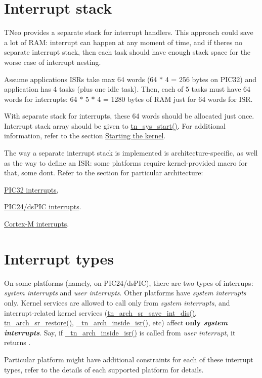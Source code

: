 \hypertarget{interrupts_interrupt_stack}{}\section{Interrupt stack}\label{interrupts_interrupt_stack}
T\+Neo provides a separate stack for interrupt handlers. This approach could save a lot of R\+AM\+: interrupt can happen at any moment of time, and if there\textquotesingle{}s no separate interrupt stack, then each task should have enough stack space for the worse case of interrupt nesting.

Assume application\textquotesingle{}s I\+S\+Rs take max 64 words (64 $\ast$ 4 = 256 bytes on P\+I\+C32) and application has 4 tasks (plus one idle task). Then, each of 5 tasks must have 64 words for interrupts\+: 64 $\ast$ 5 $\ast$ 4 = 1280 bytes of R\+AM just for 64 words for I\+SR.

With separate stack for interrupts, these 64 words should be allocated just once. Interrupt stack array should be given to {\ttfamily \hyperlink{tn__sys_8h_a62ab25d9d8ca01c02d368968f19e49bf}{tn\+\_\+sys\+\_\+start()}}. For additional information, refer to the section \hyperlink{quick_guide_starting_the_kernel}{Starting the kernel}.

The way a separate interrupt stack is implemented is architecture-\/specific, as well as the way to define an I\+SR\+: some platforms require kernel-\/provided macro for that, some don\textquotesingle{}t. Refer to the section for particular architecture\+:


\begin{DoxyItemize}
\item \hyperlink{arch_specific_pic32_interrupts}{P\+I\+C32 interrupts},
\item \hyperlink{arch_specific_pic24_interrupts}{P\+I\+C24/ds\+P\+IC interrupts}.
\item \hyperlink{arch_specific_cortex_m_interrupts}{Cortex-\/M interrupts}.
\end{DoxyItemize}\hypertarget{interrupts_interrupt_types}{}\section{Interrupt types}\label{interrupts_interrupt_types}
On some platforms (namely, on P\+I\+C24/ds\+P\+IC), there are two types of interrups\+: {\itshape system interrupts} and {\itshape user interrupts}. Other platforms have {\itshape system interrupts} only. Kernel services are allowed to call only from {\itshape system interrupts}, and interrupt-\/related kernel services ({\ttfamily \hyperlink{tn__arch_8h_a7078b776570ca67a51b89d2746bdb6f7}{tn\+\_\+arch\+\_\+sr\+\_\+save\+\_\+int\+\_\+dis()}}, {\ttfamily \hyperlink{tn__arch_8h_aa755327bd8c4e4303c87c2b0cbed0f17}{tn\+\_\+arch\+\_\+sr\+\_\+restore()}}, {\ttfamily \hyperlink{tn__arch_8h_a34ffbae8b6837f7f3014bca9991e2272}{\+\_\+tn\+\_\+arch\+\_\+inside\+\_\+isr()}}, etc) affect {\bfseries only {\itshape system interrupts}}. Say, if {\ttfamily \hyperlink{tn__arch_8h_a34ffbae8b6837f7f3014bca9991e2272}{\+\_\+tn\+\_\+arch\+\_\+inside\+\_\+isr()}} is called from {\itshape user interrupt}, it returns {}.

Particular platform might have additional constraints for each of these interrupt types, refer to the details of each supported platform for details. 